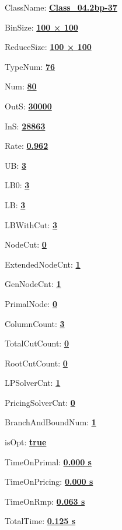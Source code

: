 \documentclass[11pt]{article}
\begin{document}
\pagestyle{empty}


ClassName: \underline{\textbf{Class_04.2bp-37}}
\par
BinSize: \underline{\textbf{100 × 100}}
\par
ReduceSize: \underline{\textbf{100 × 100}}
\par
TypeNum: \underline{\textbf{76}}
\par
Num: \underline{\textbf{80}}
\par
OutS: \underline{\textbf{30000}}
\par
InS: \underline{\textbf{28863}}
\par
Rate: \underline{\textbf{0.962}}
\par
UB: \underline{\textbf{3}}
\par
LB0: \underline{\textbf{3}}
\par
LB: \underline{\textbf{3}}
\par
LBWithCut: \underline{\textbf{3}}
\par
NodeCut: \underline{\textbf{0}}
\par
ExtendedNodeCnt: \underline{\textbf{1}}
\par
GenNodeCnt: \underline{\textbf{1}}
\par
PrimalNode: \underline{\textbf{0}}
\par
ColumnCount: \underline{\textbf{3}}
\par
TotalCutCount: \underline{\textbf{0}}
\par
RootCutCount: \underline{\textbf{0}}
\par
LPSolverCnt: \underline{\textbf{1}}
\par
PricingSolverCnt: \underline{\textbf{0}}
\par
BranchAndBoundNum: \underline{\textbf{1}}
\par
isOpt: \underline{\textbf{true}}
\par
TimeOnPrimal: \underline{\textbf{0.000 s}}
\par
TimeOnPricing: \underline{\textbf{0.000 s}}
\par
TimeOnRmp: \underline{\textbf{0.063 s}}
\par
TotalTime: \underline{\textbf{0.125 s}}
\par
\newpage
\end{document}

